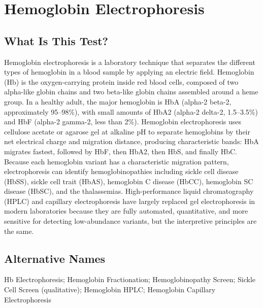\chapter{Hemoglobin Electrophoresis}

\section*{What Is This Test?}
Hemoglobin electrophoresis is a laboratory technique that separates the different types of hemoglobin in a blood sample by applying an electric field. Hemoglobin (Hb) is the oxygen-carrying protein inside red blood cells, composed of two alpha-like globin chains and two beta-like globin chains assembled around a heme group. In a healthy adult, the major hemoglobin is HbA (alpha-2 beta-2, approximately 95--98\%), with small amounts of HbA2 (alpha-2 delta-2, 1.5--3.5\%) and HbF (alpha-2 gamma-2, less than 2\%). Hemoglobin electrophoresis uses cellulose acetate or agarose gel at alkaline pH to separate hemoglobins by their net electrical charge and migration distance, producing characteristic bands: HbA migrates fastest, followed by HbF, then HbA2, then HbS, and finally HbC. Because each hemoglobin variant has a characteristic migration pattern, electrophoresis can identify hemoglobinopathies including sickle cell disease (HbSS), sickle cell trait (HbAS), hemoglobin C disease (HbCC), hemoglobin SC disease (HbSC), and the thalassemias. High-performance liquid chromatography (HPLC) and capillary electrophoresis have largely replaced gel electrophoresis in modern laboratories because they are fully automated, quantitative, and more sensitive for detecting low-abundance variants, but the interpretive principles are the same.

\section*{Alternative Names}
Hb Electrophoresis; Hemoglobin Fractionation; Hemoglobinopathy Screen; Sickle Cell Screen (qualitative); Hemoglobin HPLC; Hemoglobin Capillary Electrophoresis

